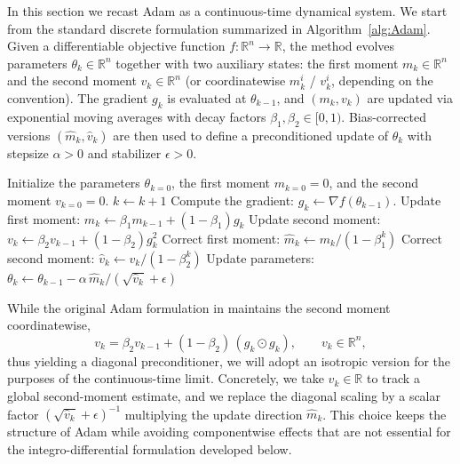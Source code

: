 \documentclass{article} %
\begin{document}
In this section we recast Adam as a continuous-time dynamical system. We start from the standard discrete formulation summarized in Algorithm~\ref{alg:Adam}. Given a differentiable objective function $f:\mathbb{R}^n\to\mathbb{R}$, the method evolves parameters $\theta_k\in\mathbb{R}^n$ together with two auxiliary states: the first moment $m_k\in\mathbb{R}^n$ and the second moment $v_k\in\mathbb{R}^n$ (or coordinatewise $m_k^i$ / $v_k^i$, depending on the convention). The gradient $g_k$ is evaluated at $\theta_{k-1}$, and $(m_k,v_k)$ are updated via exponential moving averages with decay factors $\beta_1,\beta_2\in[0,1)$. Bias-corrected versions $(\hat m_k,\hat v_k)$ are then used to define a preconditioned update of $\theta_k$ with stepsize $\alpha>0$ and stabilizer $\epsilon>0$.

\begin{algorithm}
\caption{Adam Optimization Algorithm}
\label{alg:Adam}
\begin{algorithmic}[1] 
    \State Initialize the parameters $\theta_{k=0}$, the first moment $m_{k=0} = 0$, and the second moment $v_{k=0} = 0$.
        \State $k \leftarrow k + 1$
        \State Compute the gradient: $g_{k} \leftarrow \nabla f(\theta_{k-1})$.
        \State Update first moment: $m_{k} \leftarrow \beta_1 m_{k-1} + (1 - \beta_1) g_{k}$
        \State Update second moment: $v_{k} \leftarrow \beta_2 v_{k-1} + (1 - \beta_2) g_{k}^2$
        \State Correct first moment: $\hat{m}_{k} \leftarrow m_{k}/(1 - \beta_1^k)$
        \State Correct second moment: $\hat{v}_{k} \leftarrow v_{k}/(1 - \beta_2^k)$
        \State Update parameters: $\theta_{k} \leftarrow \theta_{k-1} - \alpha\, \hat{m}_{k}/(\sqrt{\hat{v}_{k}} + \epsilon)$
    \EndWhile
\end{algorithmic}
\end{algorithm}

While the original Adam formulation in \cite{kingma2014} maintains the second moment coordinatewise,
\[
v_k = \beta_2 v_{k-1} + (1-\beta_2)\,(g_k \odot g_k), \qquad v_k\in\mathbb{R}^n,
\]
thus yielding a diagonal preconditioner, we will adopt an isotropic version for the purposes of the continuous-time limit. Concretely, we take $v_k\in\mathbb{R}$ to track a global second-moment estimate, and we replace the diagonal scaling by a scalar factor $(\sqrt{\hat v_k}+\epsilon)^{-1}$ multiplying the update direction $\hat m_k$. This choice keeps the structure of Adam while avoiding componentwise effects that are not essential for the integro-differential formulation developed below.
\end{document}

